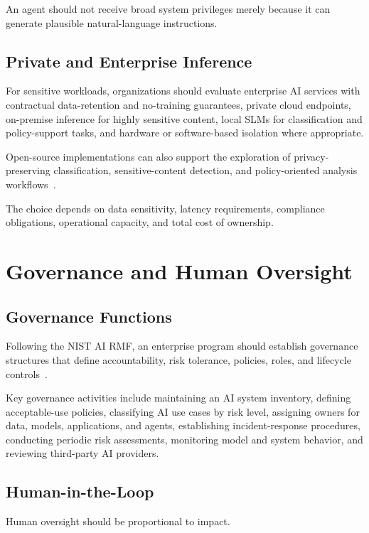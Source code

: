 \documentclass[conference]{IEEEtran}
\begin{document}
An agent should not receive broad system privileges merely because it can generate plausible natural-language instructions.

\subsection{Private and Enterprise Inference}

For sensitive workloads, organizations should evaluate enterprise AI services with contractual data-retention and no-training guarantees, private cloud endpoints, on-premise inference for highly sensitive content, local SLMs for classification and policy-support tasks, and hardware or software-based isolation where appropriate.

Open-source implementations can also support the exploration of privacy-preserving classification, sensitive-content detection, and policy-oriented analysis workflows~\cite{lemoine_llm_shield_scan}.

The choice depends on data sensitivity, latency requirements, compliance obligations, operational capacity, and total cost of ownership.

\section{Governance and Human Oversight}

\subsection{Governance Functions}

Following the NIST AI RMF, an enterprise program should establish governance structures that define accountability, risk tolerance, policies, roles, and lifecycle controls~\cite{nist_airmf}.

Key governance activities include maintaining an AI system inventory, defining acceptable-use policies, classifying AI use cases by risk level, assigning owners for data, models, applications, and agents, establishing incident-response procedures, conducting periodic risk assessments, monitoring model and system behavior, and reviewing third-party AI providers.

\subsection{Human-in-the-Loop}

Human oversight should be proportional to impact.
\end{document}
